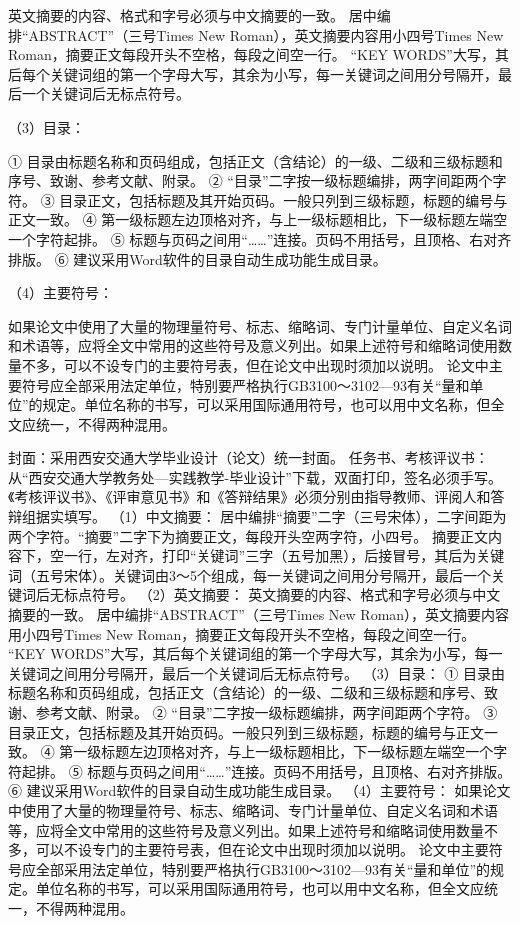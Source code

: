 英文摘要的内容、格式和字号必须与中文摘要的一致。
居中编排“ABSTRACT”（三号Times New Roman），英文摘要内容用小四号Times New Roman，摘要正文每段开头不空格，每段之间空一行。
“KEY WORDS”大写，其后每个关键词组的第一个字母大写，其余为小写，每一关键词之间用分号隔开，最后一个关键词后无标点符号。

（3）目录：

① 目录由标题名称和页码组成，包括正文（含结论）的一级、二级和三级标题和序号、致谢、参考文献、附录。
② “目录”二字按一级标题编排，两字间距两个字符。
③ 目录正文，包括标题及其开始页码。一般只列到三级标题，标题的编号与正文一致。
④ 第一级标题左边顶格对齐，与上一级标题相比，下一级标题左端空一个字符起排。
⑤ 标题与页码之间用“……”连接。页码不用括号，且顶格、右对齐排版。
⑥ 建议采用Word软件的目录自动生成功能生成目录。

（4）主要符号：

如果论文中使用了大量的物理量符号、标志、缩略词、专门计量单位、自定义名词和术语等，应将全文中常用的这些符号及意义列出。如果上述符号和缩略词使用数量不多，可以不设专门的主要符号表，但在论文中出现时须加以说明。
论文中主要符号应全部采用法定单位，特别要严格执行GB3100～3102—93有关“量和单位”的规定。单位名称的书写，可以采用国际通用符号，也可以用中文名称，但全文应统一，不得两种混用。

封面：采用西安交通大学毕业设计（论文）统一封面。
任务书、考核评议书：从“西安交通大学教务处—实践教学-毕业设计”下载，双面打印，签名必须手写。《考核评议书》、《评审意见书》和《答辩结果》必须分别由指导教师、评阅人和答辩组据实填写。
（1）中文摘要：
居中编排“摘要”二字（三号宋体），二字间距为两个字符。“摘要”二字下为摘要正文，每段开头空两字符，小四号。
摘要正文内容下，空一行，左对齐，打印“关键词”三字（五号加黑），后接冒号，其后为关键词（五号宋体）。关键词由3～5个组成，每一关键词之间用分号隔开，最后一个关键词后无标点符号。
（2）英文摘要：
英文摘要的内容、格式和字号必须与中文摘要的一致。
居中编排“ABSTRACT”（三号Times New Roman），英文摘要内容用小四号Times New Roman，摘要正文每段开头不空格，每段之间空一行。
“KEY WORDS”大写，其后每个关键词组的第一个字母大写，其余为小写，每一关键词之间用分号隔开，最后一个关键词后无标点符号。
（3）目录：
① 目录由标题名称和页码组成，包括正文（含结论）的一级、二级和三级标题和序号、致谢、参考文献、附录。
② “目录”二字按一级标题编排，两字间距两个字符。
③ 目录正文，包括标题及其开始页码。一般只列到三级标题，标题的编号与正文一致。
④ 第一级标题左边顶格对齐，与上一级标题相比，下一级标题左端空一个字符起排。
⑤ 标题与页码之间用“……”连接。页码不用括号，且顶格、右对齐排版。
⑥ 建议采用Word软件的目录自动生成功能生成目录。
（4）主要符号：
如果论文中使用了大量的物理量符号、标志、缩略词、专门计量单位、自定义名词和术语等，应将全文中常用的这些符号及意义列出。如果上述符号和缩略词使用数量不多，可以不设专门的主要符号表，但在论文中出现时须加以说明。
论文中主要符号应全部采用法定单位，特别要严格执行GB3100～3102—93有关“量和单位”的规定。单位名称的书写，可以采用国际通用符号，也可以用中文名称，但全文应统一，不得两种混用。

